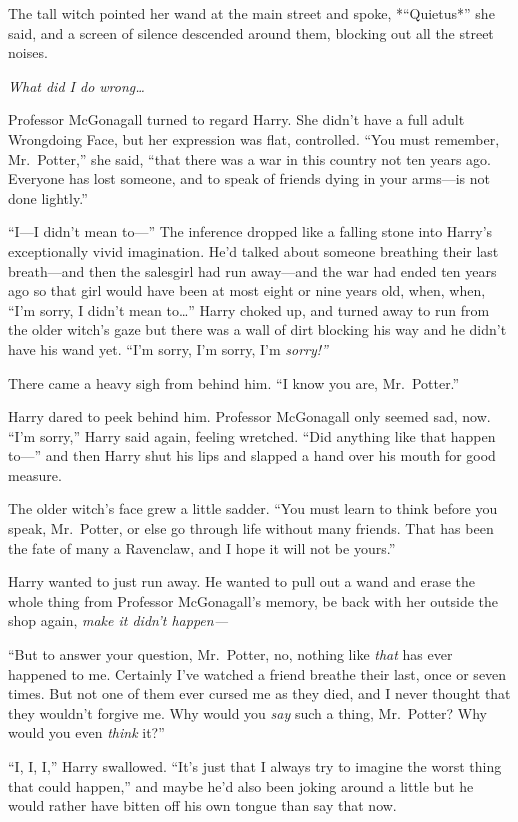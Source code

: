 The tall witch pointed her wand at the main street and spoke,
*``Quietus*'' she said, and a screen of silence descended around them,
blocking out all the street noises.

\emph{What did I do wrong\ldots{}}

Professor McGonagall turned to regard Harry. She didn't have a full
adult Wrongdoing Face, but her expression was flat, controlled. ``You
must remember, Mr.~Potter,'' she said, ``that there was a war in this
country not ten years ago. Everyone has lost someone, and to speak of
friends dying in your arms---is not done lightly.''

``I---I didn't mean to---'' The inference dropped like a falling stone
into Harry's exceptionally vivid imagination. He'd talked about someone
breathing their last breath---and then the salesgirl had run away---and
the war had ended ten years ago so that girl would have been at most
eight or nine years old, when, when, ``I'm sorry, I didn't mean
to\ldots{}'' Harry choked up, and turned away to run from the older
witch's gaze but there was a wall of dirt blocking his way and he didn't
have his wand yet. ``I'm sorry, I'm sorry, I'm \emph{sorry!''}

There came a heavy sigh from behind him. ``I know you are, Mr.~Potter.''

Harry dared to peek behind him. Professor McGonagall only seemed sad,
now. ``I'm sorry,'' Harry said again, feeling wretched. ``Did anything
like that happen to---'' and then Harry shut his lips and slapped a hand
over his mouth for good measure.

The older witch's face grew a little sadder. ``You must learn to think
before you speak, Mr.~Potter, or else go through life without many
friends. That has been the fate of many a Ravenclaw, and I hope it will
not be yours.''

Harry wanted to just run away. He wanted to pull out a wand and erase
the whole thing from Professor McGonagall's memory, be back with her
outside the shop again, \emph{make it didn't happen---}

``But to answer your question, Mr.~Potter, no, nothing like \emph{that}
has ever happened to me. Certainly I've watched a friend breathe their
last, once or seven times. But not one of them ever cursed me as they
died, and I never thought that they wouldn't forgive me. Why would you
\emph{say} such a thing, Mr.~Potter? Why would you even \emph{think}
it?''

``I, I, I,'' Harry swallowed. ``It's just that I always try to imagine
the worst thing that could happen,'' and maybe he'd also been joking
around a little but he would rather have bitten off his own tongue than
say that now.

